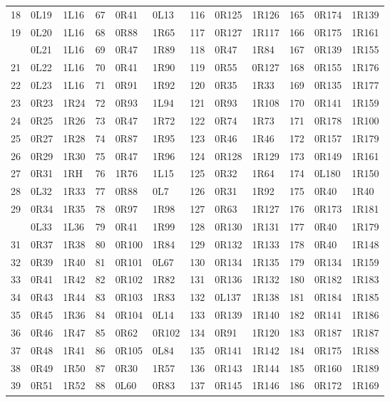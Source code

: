 \begin{center}
\begin{tabular}{rll@{\hspace{16pt}}rll@{\hspace{16pt}}rll@{\hspace{16pt}}rll}
18 & 0L19 & 1L16 & 67 & 0R41 & 0L13 & 116 & 0R125 & 1R126 & 165 & 0R174 & 1R139\\
19 & 0L20 & 1L16 & 68 & 0R88 & 1R65 & 117 & 0R127 & 1R117 & 166 & 0R175 & 1R161\\
\addlinespace[2pt]
20 & 0L21 & 1L16 & 69 & 0R47 & 1R89 & 118 & 0R47 & 1R84 & 167 & 0R139 & 1R155\\
21 & 0L22 & 1L16 & 70 & 0R41 & 1R90 & 119 & 0R55 & 0R127 & 168 & 0R155 & 1R176\\
22 & 0L23 & 1L16 & 71 & 0R91 & 1R92 & 120 & 0R35 & 1R33 & 169 & 0R135 & 1R177\\
23 & 0R23 & 1R24 & 72 & 0R93 & 1L94 & 121 & 0R93 & 1R108 & 170 & 0R141 & 1R159\\
24 & 0R25 & 1R26 & 73 & 0R47 & 1R72 & 122 & 0R74 & 1R73 & 171 & 0R178 & 1R100\\
25 & 0R27 & 1R28 & 74 & 0R87 & 1R95 & 123 & 0R46 & 1R46 & 172 & 0R157 & 1R179\\
26 & 0R29 & 1R30 & 75 & 0R47 & 1R96 & 124 & 0R128 & 1R129 & 173 & 0R149 & 1R161\\
27 & 0R31 & 1RH & 76 & 1R76 & 1L15 & 125 & 0R32 & 1R64 & 174 & 0L180 & 1R150\\
28 & 0L32 & 1R33 & 77 & 0R88 & 0L7 & 126 & 0R31 & 1R92 & 175 & 0R40 & 1R40\\
29 & 0R34 & 1R35 & 78 & 0R97 & 1R98 & 127 & 0R63 & 1R127 & 176 & 0R173 & 1R181\\
\addlinespace[2pt]
30 & 0L33 & 1L36 & 79 & 0R41 & 1R99 & 128 & 0R130 & 1R131 & 177 & 0R40 & 1R179\\
31 & 0R37 & 1R38 & 80 & 0R100 & 1R84 & 129 & 0R132 & 1R133 & 178 & 0R40 & 1R148\\
32 & 0R39 & 1R40 & 81 & 0R101 & 0L67 & 130 & 0R134 & 1R135 & 179 & 0R134 & 1R159\\
33 & 0R41 & 1R42 & 82 & 0R102 & 1R82 & 131 & 0R136 & 1R132 & 180 & 0R182 & 1R183\\
34 & 0R43 & 1R44 & 83 & 0R103 & 1R83 & 132 & 0L137 & 1R138 & 181 & 0R184 & 1R185\\
35 & 0R45 & 1R36 & 84 & 0R104 & 0L14 & 133 & 0R139 & 1R140 & 182 & 0R141 & 1R186\\
36 & 0R46 & 1R47 & 85 & 0R62 & 0R102 & 134 & 0R91 & 1R120 & 183 & 0R187 & 1R187\\
37 & 0R48 & 1R41 & 86 & 0R105 & 0L84 & 135 & 0R141 & 1R142 & 184 & 0R175 & 1R188\\
38 & 0R49 & 1R50 & 87 & 0R30 & 1R57 & 136 & 0R143 & 1R144 & 185 & 0R160 & 1R189\\
39 & 0R51 & 1R52 & 88 & 0L60 & 0R83 & 137 & 0R145 & 1R146 & 186 & 0R172 & 1R169\\

\end{tabular}
\end{center}
